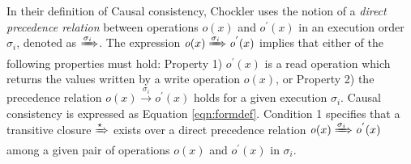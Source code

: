 \documentclass[journal,compsoc]{IEEEtran}
\begin{document}
\par In their definition of Causal consistency, Chockler uses the notion of a
\emph{direct precedence relation} between operations $\mathit{o}(x)$
 and $\mathit{o}^{'}(x) $ in an execution order $\sigma_i$, denoted as $\xRightarrow{\sigma_i}$. The expression $\mathit{o}(x) \xRightarrow{\sigma_i} \mathit{o}^{'}(x) $
  implies that either of the following properties must hold: Property 1) $\mathit{o}^{'}(x) $ is a read operation which returns the values written by a write operation $\mathit{o}(x)$, or Property 2)  %
 the precedence relation
$\mathit{o}(x) \xrightarrow{\sigma_i} \mathit{o}^{'}(x) $  holds for a given execution $\sigma_i$. Causal consistency is expressed as Equation \ref{eqn:formdef}. Condition 1 specifies that a transitive closure  $\xRightarrow{\star}$ exists
  over a direct precedence relation $\mathit{o}(x) \xRightarrow{\sigma_i} \mathit{o}^{'}(x)$ among a given pair of operations $\mathit{o}(x)$  and $\mathit{o}^{'}(x) $ in $\sigma_i$. %
\end{document}
